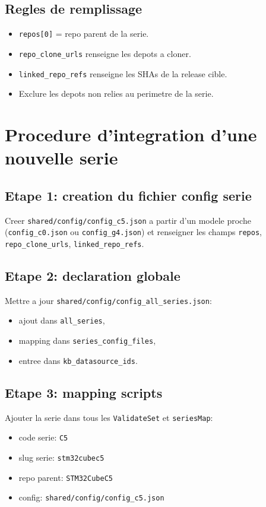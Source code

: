 \documentclass[11pt,a4paper]{article}
\begin{document}
\subsection{Regles de remplissage}
\begin{itemize}[leftmargin=*]
  \item \texttt{repos[0]} = repo parent de la serie.
  \item \texttt{repo\_clone\_urls} renseigne les depots a cloner.
  \item \texttt{linked\_repo\_refs} renseigne les SHAs de la release cible.
  \item Exclure les depots non relies au perimetre de la serie.
\end{itemize}

\section{Procedure d'integration d'une nouvelle serie}
\subsection{Etape 1: creation du fichier config serie}
Creer \texttt{shared/config/config\_c5.json} a partir d'un modele proche
(\texttt{config\_c0.json} ou \texttt{config\_g4.json}) et renseigner les champs
\texttt{repos}, \texttt{repo\_clone\_urls}, \texttt{linked\_repo\_refs}.

\subsection{Etape 2: declaration globale}
Mettre a jour \texttt{shared/config/config\_all\_series.json}:
\begin{itemize}[leftmargin=*]
  \item ajout dans \texttt{all\_series},
  \item mapping dans \texttt{series\_config\_files},
  \item entree dans \texttt{kb\_datasource\_ids}.
\end{itemize}

\subsection{Etape 3: mapping scripts}
Ajouter la serie dans tous les \texttt{ValidateSet} et \texttt{seriesMap}:
\begin{itemize}[leftmargin=*]
  \item code serie: \texttt{C5}
  \item slug serie: \texttt{stm32cubec5}
  \item repo parent: \texttt{STM32CubeC5}
  \item config: \texttt{shared/config/config\_c5.json}
\end{itemize}
\end{document}
